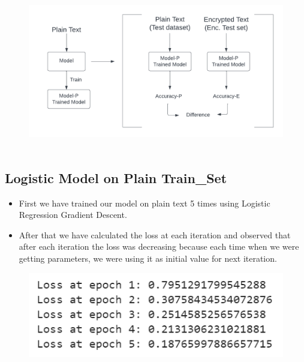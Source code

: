 \documentclass{article}
\begin{document}
\begin{figure}[!h]
\centering
\includegraphics[width = 4 in]{img12.png}~
\end{figure}

\subsection{Logistic Model on Plain Train\_Set}

\begin{itemize}
\item First we have trained our model on plain text 5 times using Logistic Regression  Gradient Descent.

\item After that we have calculated the loss at each iteration and observed that after each iteration the loss was decreasing because each time when we were getting parameters, we were using it as initial value for next iteration.
 
\end{itemize}

\begin{figure}[!h]
\centering
\includegraphics[width = 2.8 in]{img13.png}~
\end{figure}
\end{document}
